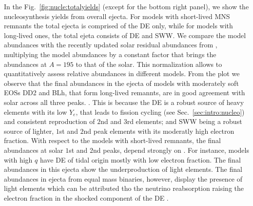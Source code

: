 In the Fig.~\ref{fig:nucle:totalyields} (except for the bottom right panel), 
we show the nucleosynthesis yields from overall ejecta.
For models with short-lived \ac{MNS} remnants the total ejecta is comprised 
of the \ac{DE} only, while for models with long-lived ones, the total ejeta 
consists of \ac{DE} and \ac{SWW}. 
%
We compare the model abundances with the recently updated solar residual 
\rproc{} abundances from \citet{Prantzos2020},
%
multiplying the model abundances by a constant factor that brings the abundances 
at $A=195$ to that of the solar. This normalization allows to quantitatively 
assess relative abundances in different models.
%
%
From the plot we observe that the final \rproc{} abundances in the ejecta of models 
with moderately soft \acp{EOS} DD2 and BLh, that form long-lived remannts, are in 
good agreement with solar across all three \rproc{} peaks. .
This is because the \ac{DE} is a robust source of heavy elements with its low 
$Y_e$, that leads to fission cycling (see Sec.~\ref{sec:intro:nucleo}) and 
consistent reproduction of $2$nd and $3$rd \rproc{} elements; 
and \ac{SWW} being a robust source of lighter, $1$st and $2$nd peak elements
with its moderatly high electron fraction.
%
With respect to the models with short-lived remnants, the final \rproc{} abundances 
at solar $1$st and $2$nd \rproc{} peaks, 
depend strongly on \mr{}. 
For instance, models with high $q$ have \ac{DE} of tidal origin mostly with low 
electron fraction. The final \rproc{} abundances in this ejecta show the underproduction 
of light elements. 
The final abundances in ejecta from equal mass binaries, 
however, display the presence of light \rproc{} elements which can be attributed 
tho the neutrino reabsorption raising the electron fraction 
in the shocked component of the \ac{DE} \citep{Wanajo:2014wha,Radice:2018pdn}. 

